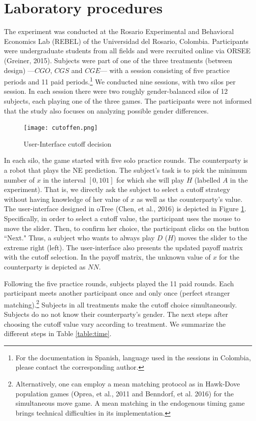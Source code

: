\documentclass[11pt,english]{article}
\begin{document}
\section{Laboratory procedures}
\label{sec:game}

The experiment was conducted at the Rosario Experimental and Behavioral Economics Lab (REBEL) of the Universidad del Rosario, Colombia. Participants were undergraduate students from all fields and were recruited online via ORSEE (Greiner, 2015). Subjects were part of one of the three treatments (between design) ---$CGO$, $CGS$ and $CGE$---  with  a session consisting of five practice periods and 11 paid periods.\footnote{For the documentation in Spanish, language used in the sessions in Colombia, please contact the corresponding author.} We conducted nine sessions, with two silos per session. In each session there were two roughly gender-balanced silos of 12 subjects, each playing one of the three games. The participants were not informed that the study also focuses on analyzing possible gender differences.

\begin{center}
\begin{figure}[ht]
\centering{}%
\texttt{[image: cutoffen.png]}%
\caption{User-Interface cutoff decision} 
\label{fig:ui}
\end{figure}
\end{center}
In each silo, the game started with five solo practice rounds. The counterparty is a robot that plays the NE prediction. The subject's task is to pick the minimum number of $x$ in the interval $[0,101]$ for which she will play $H$ (labelled $A$ in the experiment). That is, we directly ask the subject to select a cutoff strategy without having knowledge of her value of $x$ as well as the counterparty's value. The user-interface designed in oTree (Chen, et al., 2016) is depicted in Figure \ref{fig:ui}. Specifically, in order to select a cutoff value, the participant uses the mouse to move the slider. Then, to confirm her choice, the participant clicks on the button ``Next." Thus, a subject who wants to always play $D$ ($H$)  moves the slider to the extreme right (left). The user-interface also presents the updated payoff matrix with the cutoff selection. In the payoff matrix, the unknown value of $x$ for the counterparty is depicted as $NN$.

Following the five practice rounds, subjects played the 11 paid rounds. Each participant meets another participant once and only once (perfect stranger matching).\footnote{Alternatively, one can employ a mean matching protocol as in Hawk-Dove population games (Oprea, et al., 2011 and Benndorf, et al. 2016) for the simultaneous move game. A mean matching in the endogenous timing game brings technical difficulties in its implementation.} Subjects in all treatments make the cutoff choice simultaneously. Subjects do no not know their counterparty's gender. The next steps after choosing the cutoff value vary according to treatment. We summarize the different steps in Table \ref{table:time}. 
\end{document}
